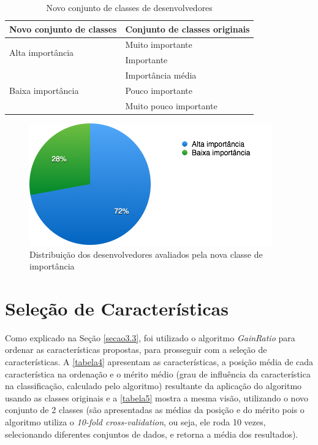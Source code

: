 
\begin{table}[h]
	\centering
	\caption{Novo conjunto de classes de desenvolvedores}
	\label{tabela3}
	\def\arraystretch{1.5}
	\begin{tabular}{|p{6cm}|p{8.5cm}|}
		\hline
		\textbf{Novo conjunto de classes}  & \textbf{Conjunto de classes originais} \\ \hline
		\multirow{2}{*}{Alta importância}  & Muito importante                       \\ \cline{2-2} 
		& Importante                             \\ \hline
		\multirow{3}{*}{Baixa importância} & Importância média                      \\ \cline{2-2} 
		& Pouco importante                       \\ \cline{2-2} 
		& Muito pouco importante                 \\ \hline
	\end{tabular}
\end{table}

\begin{figure}[h]
	\centering
	\includegraphics[scale=0.8]{figs/geral/imagem-classe-alternativa.png}
	\caption{\label{fig_4}Distribuição dos desenvolvedores avaliados pela nova classe de importância}
\end{figure}

\section{Seleção de Características}\label{secao4.3}

Como explicado na Seção \ref{secao3.3}, foi utilizado o algoritmo \textit{GainRatio} para ordenar as características propostas, para prosseguir com a seleção de características. A \autoref{tabela4} apresentam as características, a posição média de cada característica na ordenação e o mérito médio (grau de influência da característica na classificação, calculado pelo algoritmo) resultante da aplicação do algoritmo usando as classes originais e a \autoref{tabela5} mostra a mesma visão, utilizando o novo conjunto de 2 classes (são apresentadas as médias da posição e do mérito pois o algoritmo utiliza o \textit{10-fold cross-validation}, ou seja, ele roda 10 vezes, selecionando diferentes conjuntos de dados, e retorna a média dos resultados).

